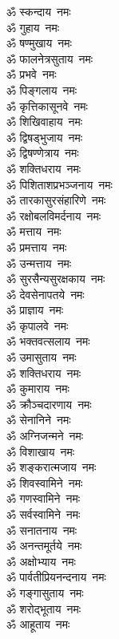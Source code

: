 \begin{multicols}{2}
\begin{flushleft}
ॐ स्कन्दाय~नमः\\
ॐ गुहाय~नमः\\
ॐ षण्मुखाय~नमः\\
ॐ फालनेत्रसुताय~नमः\\
ॐ प्रभवे~नमः\\
ॐ पिङ्गलाय~नमः\\
ॐ कृत्तिकासूनवे~नमः\\
ॐ शिखिवाहाय~नमः\\
ॐ द्विषड्भुजाय~नमः\\
ॐ द्विषण्णेत्राय~नमः\hfill{}\\
ॐ शक्तिधराय~नमः\\
ॐ पिशिताशप्रभञ्जनाय~नमः\\
ॐ तारकासुरसंहारिणे~नमः\\
ॐ रक्षोबलविमर्दनाय~नमः\\
ॐ मत्ताय~नमः\\
ॐ प्रमत्ताय~नमः\\
ॐ उन्मत्ताय~नमः\\
ॐ सुरसैन्यसुरक्षकाय~नमः\\
ॐ देवसेनापतये~नमः\\
ॐ प्राज्ञाय~नमः\hfill{}\\
ॐ कृपालवे~नमः\\
ॐ भक्तवत्सलाय~नमः\\
ॐ उमासुताय~नमः\\
ॐ शक्तिधराय~नमः\\
ॐ कुमाराय~नमः\\
ॐ क्रौञ्चदारणाय~नमः\\
ॐ सेनानिने~नमः\\
ॐ अग्निजन्मने~नमः\\
ॐ विशाखाय~नमः\\
ॐ शङ्करात्मजाय~नमः\hfill{}\\
ॐ शिवस्वामिने~नमः\\
ॐ गणस्वामिने~नमः\\
ॐ सर्वस्वामिने~नमः\\
ॐ सनातनाय~नमः\\
ॐ अनन्तमूर्तये~नमः\\
ॐ अक्षोभ्याय~नमः\\
ॐ पार्वतीप्रियनन्दनाय~नमः\\
ॐ गङ्गासुताय~नमः\\
ॐ शरोद्भूताय~नमः\\
ॐ आहूताय~नमः\hfill{}\\

\end{flushleft}
\end{multicols}
